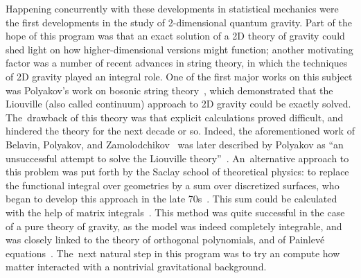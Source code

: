 \documentclass[10pt,a4paper]{amsart}
\numberwithin{equation}{section}
\begin{document}
Happening concurrently with these developments in statistical mechanics were the first developments in the study of 2-dimensional quantum gravity. Part of the hope of this program was that an exact solution of a 2D theory of gravity could shed light on how higher-dimensional versions might function; another motivating factor was a number of recent advances in string theory, in which the techniques of 2D gravity played an integral role. One of the first major works on this subject was Polyakov's work on bosonic string theory~\cite{Polyakov1}, which demonstrated that the Liouville (also called continuum) approach to 2D gravity could be exactly solved. The~drawback of this theory was that explicit calculations proved difficult, and hindered the theory for the next decade or so. Indeed, the aforementioned work of Belavin, Polyakov, and Zamolodchikov~\cite{BPZ} was later described
by Polyakov as ``an unsuccessful attempt to solve the Liouville theory''~\cite{Polyakov2}. An~alternative approach to this problem was put forth by the Saclay school of theoretical physics: to replace the functional integral over geometries by a sum over discretized surfaces, who began to develop this approach in the late 70s~\cite{BIPZ,IZ}. This sum could be calculated with the help of matrix integrals~\cite{DKKM, David,Kazakov4, KMK}. This method was quite successful in the case of a pure theory of gravity, as the model was indeed completely integrable, and was closely linked to the theory of orthogonal polynomials, and of Painlev\'{e} equations~\cite{FIK1,FIK2}. The~next natural step in this program was to try an compute how matter interacted with a nontrivial gravitational background.
\end{document}
